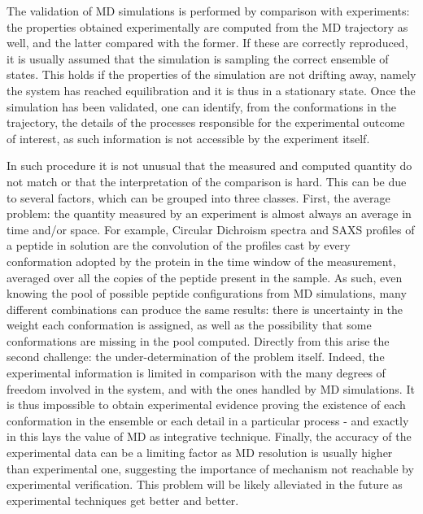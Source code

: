 The validation of MD simulations is performed by comparison with experiments: the properties obtained experimentally are computed from the MD trajectory as well, and the latter compared with the former. If these are correctly reproduced, it is usually assumed that the simulation is sampling the correct ensemble of states. This holds if the properties of the simulation are not drifting away, namely the system has reached equilibration and it is thus in a stationary state.
%
Once the simulation has been validated, one can identify, from the conformations in the trajectory, the details of the processes responsible for the experimental outcome of interest, as such information is not accessible by the experiment itself.

In such procedure it is not unusual that the measured and computed quantity do not match or that the interpretation of the comparison is hard. This can be due to several factors, which can be grouped into three classes.
%
First, the average problem: the quantity measured by an experiment is almost always an average in time and/or space. For example, Circular Dichroism spectra and SAXS profiles of a peptide in solution are the convolution of the profiles cast by every conformation adopted by the protein in the time window of the measurement, averaged over all the copies of the peptide present in the sample. As such, even knowing the pool of possible peptide configurations from MD simulations, many different combinations can produce the same results: there is uncertainty in the weight each conformation is assigned, as well as the possibility that some conformations are missing in the pool computed.
%
Directly from this arise the second challenge: the under-determination of the problem itself. Indeed, the experimental information is limited in comparison with the many degrees of freedom involved in the system, and with the ones handled by MD simulations. It is thus impossible to obtain experimental evidence proving the existence of each conformation in the ensemble or each detail in a particular process - and exactly in this lays the value of MD as integrative technique.
%
Finally, the accuracy of the experimental data can be a limiting factor as MD resolution is usually higher than experimental one, suggesting the importance of mechanism not reachable by experimental verification. This problem will be likely alleviated in the future as experimental techniques get better and better.

